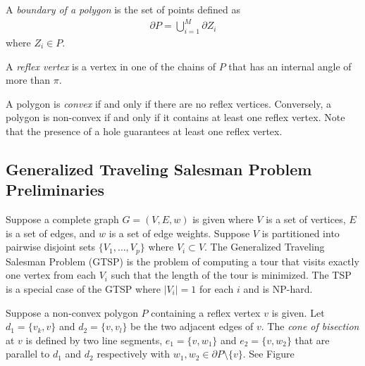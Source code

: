 \documentclass[../main.tex]{subfiles}
\begin{document}
\begin{definition}
A \emph{boundary of a polygon} is the set of points defined as
	\begin{equation}
	\begin{aligned}
 		\partial P=\bigcup^M_{i=1}\partial Z_i
	\end{aligned}
	\end{equation}
where $Z_i\in P$.
\end{definition}

\begin{definition}
A \emph{reflex vertex} is a vertex in one of the chains of $P$ that has an internal angle of more than $\pi$.
\end{definition}

\begin{definition}
A polygon is \emph{convex} if and only if there are no reflex vertices. Conversely, a polygon is non-convex if and only if it contains at least one reflex vertex. Note that the presence of a hole guarantees at least one reflex vertex.
\end{definition}

\subsection{Generalized Traveling Salesman Problem Preliminaries}
Suppose a complete graph $G=(V,E,w)$ is given where $V$ is a set of vertices, $E$ is a set of edges, and $w$ is a set of edge weights. Suppose $V$ is partitioned into pairwise disjoint sets $\{V_1,\ldots,V_p\}$ where $V_i\subset V$. The Generalized Traveling Salesman Problem (GTSP) is the problem of computing a tour that visits exactly one vertex from each $V_i$ such that the length of the tour is minimized. The TSP is a special case of the GTSP where $|V_i|=1$ for each $i$ and is NP-hard.

\begin{definition}[Altitude]

\end{definition}

\begin{definition}
\label{def:cone_of_bisection}
Suppose a non-convex polygon $P$ containing a reflex vertex $v$ is given. Let $d_1=\{v_k, v\}$ and $d_2=\{v, v_l\}$ be the two adjacent edges of $v$. The \emph{cone of bisection} at $v$ is defined by two line segments, $e_1=\{v, w_1\}$ and $e_2=\{v, w_2\}$ that are parallel to $d_1$ and $d_2$ respectively with $w_1, w_2\in{\partial P\setminus\{v\}}$. See Figure%
\end{definition}
\end{document}
